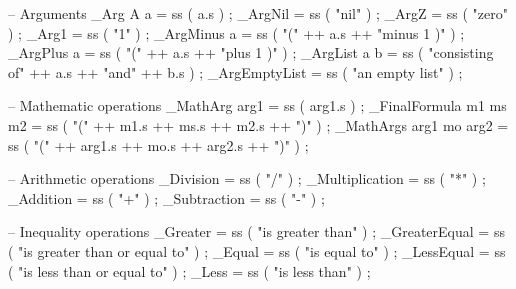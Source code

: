 \begin{lstgf}
{        -- Arguments
        _Arg A a                        = ss ( a.s ) ;
        _ArgNil                         = ss ( "nil" ) ;
        _ArgZ                           = ss ( "zero" ) ;
        _Arg1                           = ss ( "1" ) ;
        _ArgMinus a                     = ss ( "(" ++ a.s ++ "minus 1 )" ) ;
        _ArgPlus a                      = ss ( "(" ++ a.s ++ "plus 1 )" ) ;
        _ArgList a b                    = ss ( "consisting of" ++ a.s ++ "and" ++ b.s ) ;
        _ArgEmptyList                   = ss ( "an empty list" ) ;

        -- Mathematic operations
        _MathArg arg1                   = ss ( arg1.s ) ;
        _FinalFormula m1 ms m2          = ss ( "(" ++ m1.s ++ ms.s ++ m2.s ++ ")" ) ;
        _MathArgs arg1 mo arg2          = ss ( "(" ++ arg1.s ++ mo.s ++ arg2.s ++ ")" ) ;

        -- Arithmetic operations
        _Division                       = ss ( "/" ) ;
        _Multiplication                 = ss ( "*" ) ;
        _Addition                       = ss ( "+" ) ;
        _Subtraction                    = ss ( "-" ) ;

        -- Inequality operations
        _Greater                        = ss ( "is greater than" ) ;
        _GreaterEqual                   = ss ( "is greater than or equal to" ) ;
        _Equal                          = ss ( "is equal to" ) ;
        _LessEqual                      = ss ( "is less than or equal to" ) ;
        _Less                           = ss ( "is less than" ) ;

}
\end{lstgf}